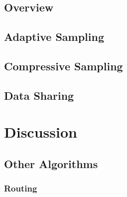 
\subsection{Overview}
\label{sec:Overview}


\subsection{Adaptive Sampling}
\label{sec:Adaptive Sampling}


\subsection{Compressive Sampling}


\subsection{Data Sharing}
\label{sec:Listings}


\section{Discussion}
\label{sec:Discussion}


\subsection{Other Algorithms}
\label{sec:Listings}

\subsubsection{Routing}
\label{sec:Listings}

